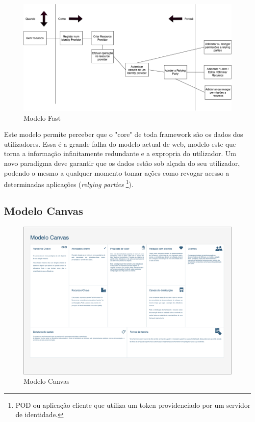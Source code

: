 \begin{figure}[h]
    \begin{center}
    \includegraphics[width=1\textwidth]{figures/Canvas-FAST.png}
    \caption{Modelo Fast}
    \end{center}
\end{figure}

Este modelo permite perceber que o "core" de toda framework são os dados dos utilizadores. Essa é a grande falha do modelo actual de web, modelo este que torna a informação infinitamente redundante e a expropria do utilizador.
Um novo paradigma deve garantir que os dados estão sob alçada do seu utilizador, podendo o mesmo a qualquer momento tomar ações como revogar acesso a determinadas aplicações (\emph{relying parties} \footnote{POD ou aplicação cliente que utiliza um token providenciado por um servidor de identidade.}).

\subsection{Modelo Canvas}
\begin{figure}[h]
    \begin{center}
    \includegraphics[width=1 \textwidth, angle=-90]{figures/Canvas-Canvas.png}
    \caption{Modelo Canvas}
    \end{center}
\end{figure}
